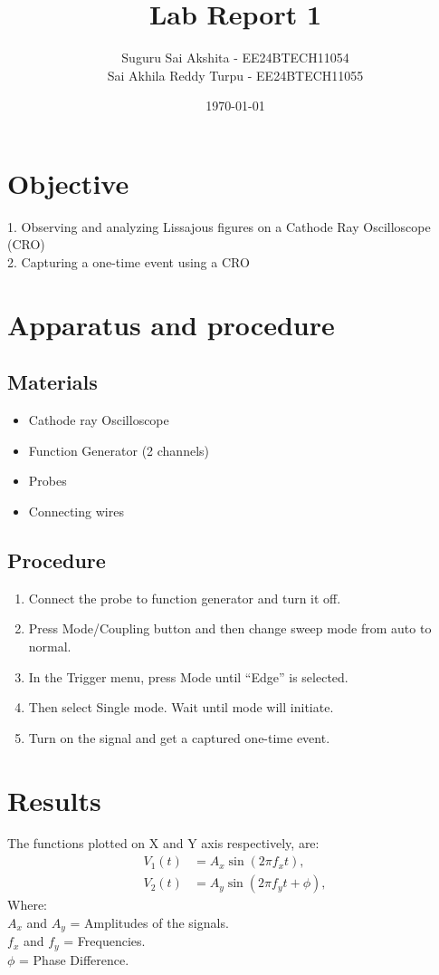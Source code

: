 \documentclass[a4paper,12pt]{article}
\title{\textbf{Lab Report 1}}
\author{Suguru Sai Akshita - EE24BTECH11054 \\Sai Akhila Reddy Turpu - EE24BTECH11055 }
\date{\today}
\begin{document}
\maketitle
\tableofcontents
\newpage

\section{Objective}

1. Observing and analyzing Lissajous figures on a Cathode Ray Oscilloscope (CRO)\\
2. Capturing a one-time event using a CRO

\section{Apparatus and procedure}
\subsection{Materials}
\begin{itemize}
    \item Cathode ray Oscilloscope
    \item Function Generator (2 channels)
    \item Probes
    \item Connecting wires
\end{itemize}

\subsection{Procedure}
\begin{enumerate}
    \item Connect the probe to function generator and turn it off.
    \item Press Mode/Coupling button and then change sweep mode from auto to normal.
    \item In the Trigger menu, press Mode until “Edge” is selected.
    \item Then select Single mode. Wait until mode will initiate.
    \item Turn on the signal and get a captured one-time event.  
\end{enumerate}

\section{Results}
The functions plotted on X and Y axis respectively, are:
\begin{align*}
    V_1(t) &= A_x \sin(2\pi f_x t), \\
    V_2(t) &= A_y \sin(2\pi f_y t + \phi),
\end{align*}
Where:\\
$A_x$ and $A_y$ = Amplitudes of the signals.\\
$f_x$ and $f_y$ = Frequencies.\\
$\phi$ = Phase Difference.\\
\end{document}
